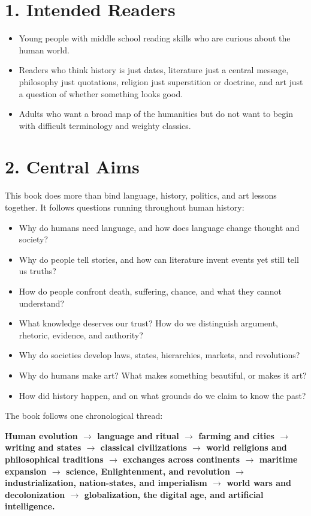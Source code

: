 \section*{1. Intended Readers}
\begin{itemize}
\item Young people with middle school reading skills who are curious about the human world.
\item Readers who think history is just dates, literature just a central message, philosophy just quotations, religion just superstition or doctrine, and art just a question of whether something looks good.
\item Adults who want a broad map of the humanities but do not want to begin with difficult terminology and weighty classics.
\end{itemize}
\section*{2. Central Aims}
This book does more than bind language, history, politics, and art lessons together. It follows questions running throughout human history:

\begin{itemize}
\item Why do humans need language, and how does language change thought and society?
\item Why do people tell stories, and how can literature invent events yet still tell us truths?
\item How do people confront death, suffering, chance, and what they cannot understand?
\item What knowledge deserves our trust? How do we distinguish argument, rhetoric, evidence, and authority?
\item Why do societies develop laws, states, hierarchies, markets, and revolutions?
\item Why do humans make art? What makes something beautiful, or makes it art?
\item How did history happen, and on what grounds do we claim to know the past?
\end{itemize}
The book follows one chronological thread:

\textbf{Human evolution $\rightarrow$ language and ritual $\rightarrow$ farming and cities $\rightarrow$ writing and states $\rightarrow$ classical civilizations $\rightarrow$ world religions and philosophical traditions $\rightarrow$ exchanges across continents $\rightarrow$ maritime expansion $\rightarrow$ science, Enlightenment, and revolution $\rightarrow$ industrialization, nation-states, and imperialism $\rightarrow$ world wars and decolonization $\rightarrow$ globalization, the digital age, and artificial intelligence.}

